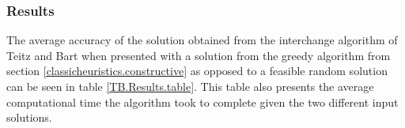 \documentclass[11pt]{article}
\begin{document}
	\subsubsection{Results}
	The average accuracy of the solution obtained from the interchange algorithm of Teitz and Bart when presented with a solution from the greedy algorithm from section \ref{classicheuristics.constructive} as opposed to a feasible random solution can be seen in table \ref{TB.Results.table}.  This table also presents the average computational time the algorithm took to complete given the two different input solutions.
	
\end{document}
